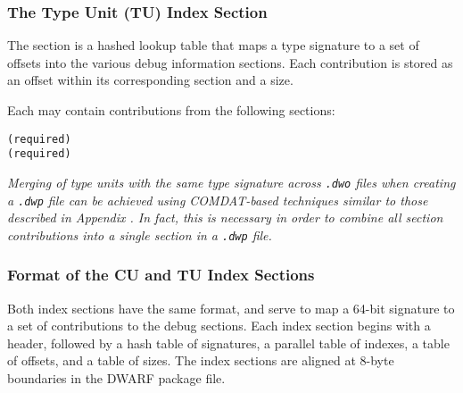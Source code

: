\subsubsection{The Type Unit (TU) Index Section}
The \dotdebugtuindex{} section is a hashed lookup table that maps a
type signature to a set of offsets into the various debug
information sections. Each contribution is stored as an offset
within its corresponding section and a size.

Each \typeunitset{} may contain contributions from the following
sections:
\begin{alltt}
    \dotdebuginfodwo{} (required) 
    \dotdebugabbrevdwo{} (required)
    \dotdebuglinedwo
    \dotdebugstroffsetsdwo
\end{alltt}

\textit{Merging of type units with the same type signature
across \texttt{.dwo} files when creating a \texttt{.dwp} file
can be achieved using COMDAT-based techniques similar to those
described in Appendix 
.
In fact, this is necessary in order to combine all \dotdebuginfodwo{}
section contributions into a single \dotdebuginfodwo{} section in a
\texttt{.dwp} file.}

\subsubsection{Format of the CU and TU Index Sections}
Both index sections have the same format, and serve to map a
64-bit signature to a set of contributions to the debug sections.
Each index section begins with a header, followed by a hash table of
signatures, a parallel table of indexes, a table of offsets, and
a table of sizes. The index sections are aligned at 8-byte
boundaries in the DWARF package file.

